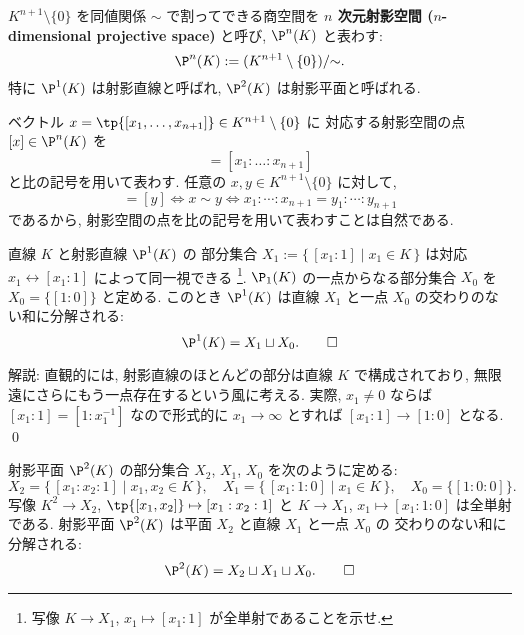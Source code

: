 \documentclass[12pt,twoside]{jarticle}
\begin{document}
$K^{n+1}\setminus\{0\}$ を同値関係 $\sim$ で割ってできる商空間を
{\bf $n$ 次元射影空間 ($n$-dimensional projective space)} と呼び, 
$\P^n(K)$ と表わす:
\begin{equation*}
  \P^n(K) := (K^{n+1}\setminus\{0\})/{\sim}.
\end{equation*}
特に $\P^1(K)$ は射影直線と呼ばれ, $\P^2(K)$ は射影平面と呼ばれる.

ベクトル $x=\tp{[x_1,\dots,x_{n+1}]}\in K^{n+1}\setminus\{0\}$ に
対応する射影空間の点 $[x]\in \P^n(K)$ を
\begin{equation*}
  [x] = [x_1:\dots:x_{n+1}]
\end{equation*}
と比の記号を用いて表わす.  任意の $x,y\in K^{n+1}\setminus\{0\}$ に対して,
\begin{equation*}
  [x] = [y] \iff x\sim y \iff x_1:\cdots:x_{n+1} = y_1:\cdots:y_{n+1}
\end{equation*}
であるから, 射影空間の点を比の記号を用いて表わすことは自然である.


\begin{question}[射影直線の胞体分割]
\label{q:cell-decomp-P^1}
  直線 $K$ と射影直線 $\P^1(K)$ の
  部分集合 $X_1:=\{\,[x_1:1]\mid x_1\in K\,\}$ 
  は対応 $x_1\leftrightarrow [x_1:1]$ によって同一視できる%
  \footnote{写像 $K\to X_1$, $x_1\mapsto[x_1:1]$ が全単射であることを示せ.}.
  $\P_1(K)$ の一点からなる部分集合 $X_0$ を $X_0=\{[1:0]\}$ と定める.
  このとき $\P^1(K)$ は直線 $X_1$ と一点 $X_0$ の交わりのない和に分解される:
  \begin{equation*}
    \P^1(K) = X_1 \sqcup X_0.
    \qed
  \end{equation*}
\end{question}

\noindent
解説: 直観的には, 射影直線のほとんどの部分は直線 $K$ で構成されており,
無限遠にさらにもう一点存在するという風に考える.
実際, $x_1\ne 0$ ならば $[x_1:1]=[1:x_1^{-1}]$ 
なので形式的に $x_1\to\infty$ とすれば $[x_1:1]\to[1:0]$ となる.
\qed


\begin{question}[射影平面の胞体分割]
\label{q:cell-decomp-P^2}
  射影平面 $\P^2(K)$ の部分集合 $X_2$, $X_1$, $X_0$ を次のように定める:
  \begin{equation*}
    X_2 = \{\, [x_1:x_2:1] \mid x_1,x_2\in K\,\},
    \quad
    X_1 = \{\, [x_1:1:0] \mid x_1\in K\,\},
    \quad
    X_0 = \{ [1:0:0] \}.
  \end{equation*}
  写像 $K^2\to X_2$, $\tp{[x_1,x_2]}\mapsto [x_1:x_2:1]$ 
  と $K\to X_1$, $x_1\mapsto [x_1:1:0]$ は全単射である.
  射影平面 $\P^2(K)$ は平面 $X_2$ と直線 $X_1$ と一点 $X_0$ の
  交わりのない和に分解される:
  \begin{equation*}
    \P^2(K) = X_2 \sqcup X_1 \sqcup X_0.
    \qed
  \end{equation*}
\end{question}
\end{document}
